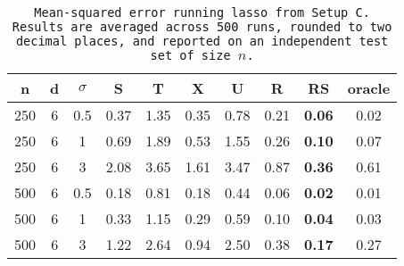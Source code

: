 \begin{table}[ht]
\centering
\begin{tabular}{cccccccccc}
  \hline
n & d & $\sigma$ & S & T & X & U & R & RS & oracle \\ 
  \hline
250 & 6 & 0.5 & 0.37 & 1.35 & 0.35 & 0.78 & 0.21 & \bf 0.06 & 0.02 \\ 
  250 & 6 & 1 & 0.69 & 1.89 & 0.53 & 1.55 & 0.26 & \bf 0.10 & 0.07 \\ 
  250 & 6 & 3 & 2.08 & 3.65 & 1.61 & 3.47 & 0.87 & \bf 0.36 & 0.61 \\ 
  500 & 6 & 0.5 & 0.18 & 0.81 & 0.18 & 0.44 & 0.06 & \bf 0.02 & 0.01 \\ 
  500 & 6 & 1 & 0.33 & 1.15 & 0.29 & 0.59 & 0.10 & \bf 0.04 & 0.03 \\ 
  500 & 6 & 3 & 1.22 & 2.64 & 0.94 & 2.50 & 0.38 & \bf 0.17 & 0.27 \\ 
   \hline
\end{tabular}
\caption{\tt Mean-squared error running \texttt{lasso} from Setup C. Results are averaged across 500 runs, rounded to two decimal places, and reported on an independent test set of size $n$.} 
\label{table:setup3}
\end{table}
